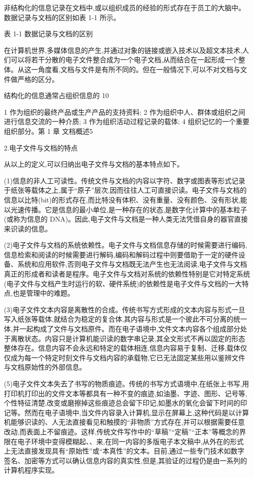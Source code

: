     非结构化的信息记录在文档中,或以组织成员的经验的形式存在于员工的大脑中。数据记录与文档的区别如表 1-1 所示。

    表 1-1 数据记录与文档的区别

    在计算机世界,多媒体信息的产生,并通过对象的链接或嵌入技术以及超文本技术,人们可以将若干分散的电子文件整合成为一个电子文档,从而结合在一起形成一个整体。从这一角度看,文档与文件是有所不同的。但在一般情况下,可以不对文档与文件做严格的区分。

    结构化的信息通常占组织信息的 10%

    1 作为组织的最终产品或生产产品的支持资料;
    2 作为组织中人、群体或组织之间进行信息交流的一种介质;
    3 作为组织活动过程记录的载体;
    4 组织记忆的一个重要组织部分。第 1 章 文档概述5

    2.电子文件与文档的特点

    从以上的定义,可以归纳出电子文件与文档的基本特点如下。

    (1)信息的非人工可读性。传统文件与文档的内容以字符、数字或图表等形式记录于纸张等载体之上,属于“原子”层次,因而往往人工可直接识读。电子文件与文档的信息以比特(bit)的形式存在,而比特没有体积、没有重量、没有颜色、没有形状,能以光速传播。它是信息的最小单位,是一种存在的状态,是数字化计算中的基本粒子(或称为信息的 DNA)。因此,电子文件与文档是一种人类无法凭借自身的器官直接来识读的信息。

    (2)电子文件与文档的系统依赖性。电子文件与文档信息存储的时候需要进行编码,信息检索和阅读的时候需要进行解码,编码和解码过程中则要借助于一定的硬件设备、系统和应用软件,否则电子文件与文档既无法产生也无法阅读,电子文件与文档真正的形成者和读者是程序。电子文件与文档对系统的依赖性特别是它对特定系统(电子文件与文档产生时运行的软、硬件系统)的依赖性是电子文件与文档的一大特点,也是管理中的难题。

    (3)电子文件文本内容是离散性的合成。传统书写方式形成的文本内容与形式一旦写入纸张等载体,就结合为稳定的复合体,其内容与形式是一个彼此不可分离的统一体,并一起构成了文件与文档原件。而在电子语境中,文件文本内容各个组成部分处于离散状态。内容只是计算机能识读的数字串记录,其全文形式不再以固定的形态整体存在。信息内容不会永远和特定的载体相连,信息内容易于复制、迁移,载体仅仅成为每一个特定时刻文件与文档内容的承载物,它已无法固定某些用以鉴辨文件与文档原始性的外部信息。

    (5)电子文件文本失去了书写的物质痕迹。传统的书写方式语境中,在纸张上书写,用打印机打印出的文件文本等都具有一种不变的痕迹,如油墨、字迹、图形、记号等,个性特征清楚,改变或磨擦掉这些痕迹总会留下印记,如墨水的氧化会留下时间的印记等。然而在电子语境中,当文件内容录入计算机,显示在屏幕上,这种代码是以计算机能够识读的、人无法直接看见和触摸的“非物质”方式存在,并可以根据需要任意改动,而表面上不留痕迹。这样,传统文件写作中的“草稿”“定稿”“正本”等概念的界限在电子环境中变得模糊起、、来,在同一内容的多版电子本文稿中,从外在的形式上无法直接发现具有“原始性”或“本真性”的文本。目前,通过一些专门技术如数字签名、加密等方式可以确认信息内容的真实性,但是,其验证的过程仍是由一系列的计算机程序实现。

